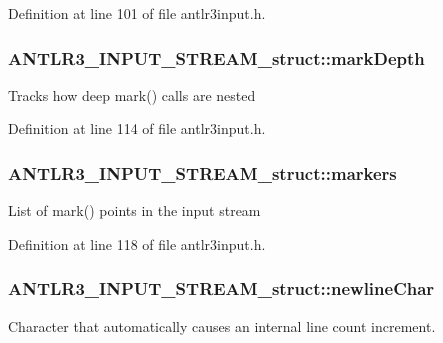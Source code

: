 Definition at line 101 of file antlr3input.\-h.

\hypertarget{struct_a_n_t_l_r3___i_n_p_u_t___s_t_r_e_a_m__struct_a849f32d3457ab4d006ed62f313431b42}{
\subsubsection[{mark\-Depth}]{ A\-N\-T\-L\-R3\-\_\-\-I\-N\-P\-U\-T\-\_\-\-S\-T\-R\-E\-A\-M\-\_\-struct\-::mark\-Depth}}\label{struct_a_n_t_l_r3___i_n_p_u_t___s_t_r_e_a_m__struct_a849f32d3457ab4d006ed62f313431b42}
Tracks how deep mark() calls are nested 

Definition at line 114 of file antlr3input.\-h.

\hypertarget{struct_a_n_t_l_r3___i_n_p_u_t___s_t_r_e_a_m__struct_a2994637c93652f92a9b8b1d3090f5eb9}{
\subsubsection[{markers}]{ A\-N\-T\-L\-R3\-\_\-\-I\-N\-P\-U\-T\-\_\-\-S\-T\-R\-E\-A\-M\-\_\-struct\-::markers}}\label{struct_a_n_t_l_r3___i_n_p_u_t___s_t_r_e_a_m__struct_a2994637c93652f92a9b8b1d3090f5eb9}
List of mark() points in the input stream 

Definition at line 118 of file antlr3input.\-h.

\hypertarget{struct_a_n_t_l_r3___i_n_p_u_t___s_t_r_e_a_m__struct_a2a7261f49bf42f8101b598f85ad86486}{
\subsubsection[{newline\-Char}]{ A\-N\-T\-L\-R3\-\_\-\-I\-N\-P\-U\-T\-\_\-\-S\-T\-R\-E\-A\-M\-\_\-struct\-::newline\-Char}}\label{struct_a_n_t_l_r3___i_n_p_u_t___s_t_r_e_a_m__struct_a2a7261f49bf42f8101b598f85ad86486}
Character that automatically causes an internal line count increment. 


